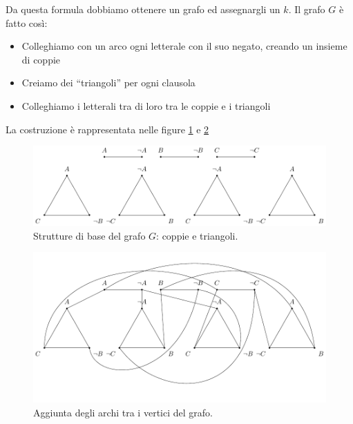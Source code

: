 Da questa formula dobbiamo ottenere un grafo ed assegnargli un $k$. Il grafo $G$ è fatto così:
\begin{itemize}
        \item Colleghiamo con un arco ogni letterale con il suo negato, creando un insieme di coppie
        \item Creiamo dei ``triangoli'' per ogni clausola
        \item Colleghiamo i letterali tra di loro tra le coppie e i triangoli
\end{itemize}
La costruzione è rappresentata nelle figure \ref{img:SATtoVC1} e \ref{img:SATtoVC2}

\begin{figure}[h]
    \begin{center}
        \includegraphics[scale=0.75]{./img/NPClass/SATtoVC1.pdf}
        \caption{Strutture di base del grafo $G$: coppie e triangoli.}
        \label{img:SATtoVC1}
    \end{center}
\end{figure}

\begin{figure}[h]
    \begin{center}
        \includegraphics[scale=0.75]{./img/NPClass/SATtoVC2.pdf}
        \caption{Aggiunta degli archi tra i vertici del grafo.}
        \label{img:SATtoVC2}
    \end{center}
\end{figure}

